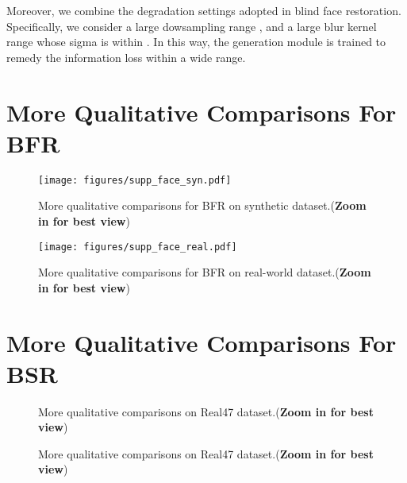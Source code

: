 \documentclass{article}
\begin{document}
Moreover, we combine the degradation settings adopted in blind face restoration. Specifically, we consider a large dowsampling range , and a large blur kernel range whose sigma is within . 
In this way, the generation module is trained to remedy the information loss within a wide range.

\section{More Qualitative Comparisons For BFR}
\label{appendix:supp_bfr}

\begin{figure}[htbp]
\centering
\texttt{[image: figures/supp\_face\_syn.pdf]}
\vspace{-1.5em}
\caption{More qualitative comparisons for BFR on synthetic dataset.(\textbf{Zoom in for best view})}
\label{fig:supp_face_syn}
\end{figure}

\begin{figure}[htbp]
\centering
\texttt{[image: figures/supp\_face\_real.pdf]}
\vspace{-1.5em}
\caption{More qualitative comparisons for BFR on real-world dataset.(\textbf{Zoom in for best view})}
\label{fig:supp_face_real}
\end{figure}

\newpage

\section{More Qualitative Comparisons For BSR}
\label{appendix:supp_bsr}

\begin{figure}[htbp]
    \centering
{}\hfill

    \hfill
    
    \caption{More qualitative comparisons on Real47 dataset.(\textbf{Zoom in for best view})}
    \label{fig:bsr_real47}
\end{figure}

\begin{figure}[hptb]
    \centering
    \ContinuedFloat {}\hfill

    \hfill
    
    \caption{More qualitative comparisons on Real47 dataset.(\textbf{Zoom in for best view})}
\end{figure}
\end{document}
